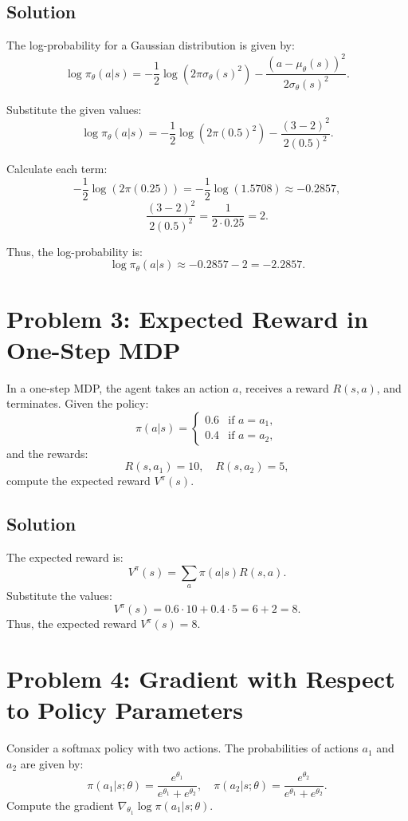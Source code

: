 \documentclass[10pt, oneside]{article}
\theoremstyle{definition}
\begin{document}
\subsection*{Solution}
The log-probability for a Gaussian distribution is given by:
\[
\log \pi_{\theta}(a | s) = -\frac{1}{2} \log(2 \pi \sigma_{\theta}(s)^2) - \frac{(a - \mu_{\theta}(s))^2}{2 \sigma_{\theta}(s)^2}.
\]

Substitute the given values:
\[
\log \pi_{\theta}(a | s) = -\frac{1}{2} \log(2 \pi (0.5)^2) - \frac{(3 - 2)^2}{2 (0.5)^2}.
\]

Calculate each term:
\[
-\frac{1}{2} \log(2 \pi (0.25)) = -\frac{1}{2} \log(1.5708) \approx -0.2857,
\]
\[
\frac{(3 - 2)^2}{2 (0.5)^2} = \frac{1}{2 \cdot 0.25} = 2.
\]

Thus, the log-probability is:
\[
\log \pi_{\theta}(a | s) \approx -0.2857 - 2 = -2.2857.
\]

\section*{Problem 3: Expected Reward in One-Step MDP}
In a one-step MDP, the agent takes an action \( a \), receives a reward \( R(s, a) \), and terminates. Given the policy:
\[
\pi(a | s) = \begin{cases} 0.6 & \text{if } a = a_1, \\ 0.4 & \text{if } a = a_2, \end{cases}
\]
and the rewards:
\[
R(s, a_1) = 10, \quad R(s, a_2) = 5,
\]
compute the expected reward \( V^{\pi}(s) \).

\subsection*{Solution}
The expected reward is:
\[
V^{\pi}(s) = \sum_a \pi(a | s) R(s, a).
\]
Substitute the values:
\[
V^{\pi}(s) = 0.6 \cdot 10 + 0.4 \cdot 5 = 6 + 2 = 8.
\]
Thus, the expected reward \( V^{\pi}(s) = 8 \).

\section*{Problem 4: Gradient with Respect to Policy Parameters}
Consider a softmax policy with two actions. The probabilities of actions \( a_1 \) and \( a_2 \) are given by:
\[
\pi(a_1 | s; \theta) = \frac{e^{\theta_1}}{e^{\theta_1} + e^{\theta_2}}, \quad \pi(a_2 | s; \theta) = \frac{e^{\theta_2}}{e^{\theta_1} + e^{\theta_2}}.
\]
Compute the gradient \( \nabla_{\theta_1} \log \pi(a_1 | s; \theta) \).
\end{document}
